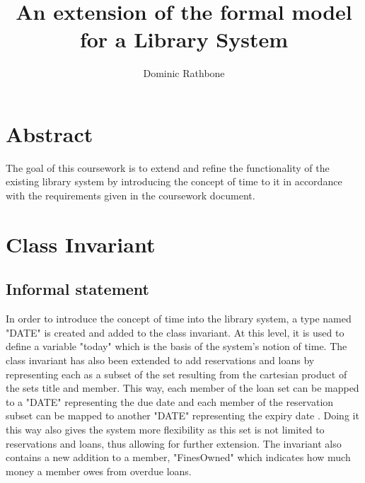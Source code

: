 \documentclass[]{report}
\title{An extension of the formal model for a Library System}
\author{Dominic Rathbone}
\begin{document}
\maketitle

\section{Abstract}
The goal of this coursework is to extend and refine the functionality of the existing library system by introducing the concept of time to it in accordance with the requirements given in the coursework document.

\section{Class Invariant}
\subsection{Informal statement}
In order to introduce the concept of time into the library system, a type named "DATE" is created and added to the class invariant. At this level, it is used to define a variable "today" which is the basis of the system's notion of time. The class invariant has also been extended to add reservations and loans by representing each as a subset of the set resulting from the cartesian product of the sets title and member. This way, each member of the loan set can be mapped to a "DATE" representing the due date and each member of the reservation subset can be mapped to another "DATE" representing the expiry date . Doing it this way also gives the system more flexibility as this set is not limited to reservations and loans, thus allowing for further extension. The invariant also contains a new addition to a member, "FinesOwned" which indicates how much money a member owes from overdue loans.
\end{document}
